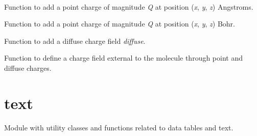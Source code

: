 \documentclass[letterpaper,10pt,english]{sphinxmanual}
\begin{document}
\begin{fulllineitems}
\label{index:qmmm.QMMM}~

\begin{fulllineitems}
\label{index:qmmm.QMMM.addChargeAngstrom}
Function to add a point charge of magnitude \emph{Q} at
position (\emph{x}, \emph{y}, \emph{z}) Angstroms.

\end{fulllineitems}


\begin{fulllineitems}
\label{index:qmmm.QMMM.addChargeBohr}
Function to add a point charge of magnitude \emph{Q} at
position (\emph{x}, \emph{y}, \emph{z}) Bohr.

\end{fulllineitems}


\begin{fulllineitems}
\label{index:qmmm.QMMM.addDiffuse}
Function to add a diffuse charge field \emph{diffuse}.

\end{fulllineitems}


\begin{fulllineitems}
\label{index:qmmm.QMMM.populateExtern}
Function to define a charge field external to the
molecule through point and diffuse charges.

\end{fulllineitems}


\end{fulllineitems}



\section{text}
\label{index:text}\label{index:module-text}
Module with utility classes and functions related
to data tables and text.
\end{document}
